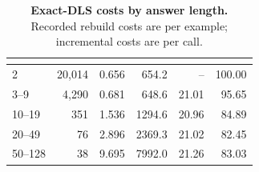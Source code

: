 \begin{table}[H]
\centering
\caption{\textbf{Exact-DLS costs by answer length.} Recorded rebuild costs are per example; incremental costs are per call.}
\label{tab:tracecost}
\begingroup\tableformat

\begin{tabularx}{\linewidth}{C{45pt}R|RRRR}
\toprule
\textbf{} & \textbf{} & \textbf{} & \textbf{} & \textbf{} & \textbf{} \\
\midrule
{}
2 & 20,014 & 0.656 & 654.2 & -- & 100.00 \\
3--9 & 4,290 & 0.681 & 648.6 & 21.01 & 95.65 \\
10--19 & 351 & 1.536 & 1294.6 & 20.96 & 84.89 \\
20--49 & 76 & 2.896 & 2369.3 & 21.02 & 82.45 \\
50--128 & 38 & 9.695 & 7992.0 & 21.26 & 83.03 \\
\bottomrule
\end{tabularx}
\endgroup
\end{table}
